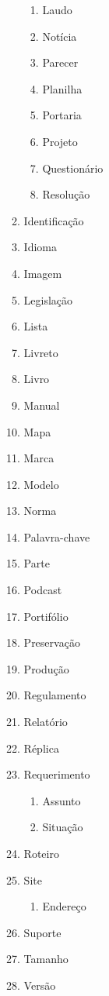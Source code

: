 \begin{multicols}{2}
\begin{itemize}
\begin{enumerate}
\begin{enumerate}
					\item Laudo		
					\item Notícia		
					\item Parecer		
					\item Planilha		
					\item Portaria		
					\item Projeto		
					\item Questionário		
					\item Resolução	\end{enumerate}	
			\item Identificação				
			\item Idioma				
			\item Imagem				
			\item Legislação				
			\item Lista				
			\item Livreto				
			\item Livro				
			\item Manual				
			\item Mapa				
			\item Marca				
			\item Modelo				
			\item Norma				
			\item Palavra-chave				
			\item Parte				
			\item Podcast				
			\item Portifólio				
			\item Preservação				
			\item Produção				
			\item Regulamento				
			\item Relatório				
			\item Réplica				
			\item Requerimento	\begin{enumerate}			
					\item Assunto		
					\item Situação	\end{enumerate}	
			\item Roteiro				
			\item Site	\begin{enumerate}			
					\item Endereço	\end{enumerate}	
			\item Suporte				
			\item Tamanho				
			\item Versão				

\end{enumerate}
\end{itemize}
\end{multicols}
